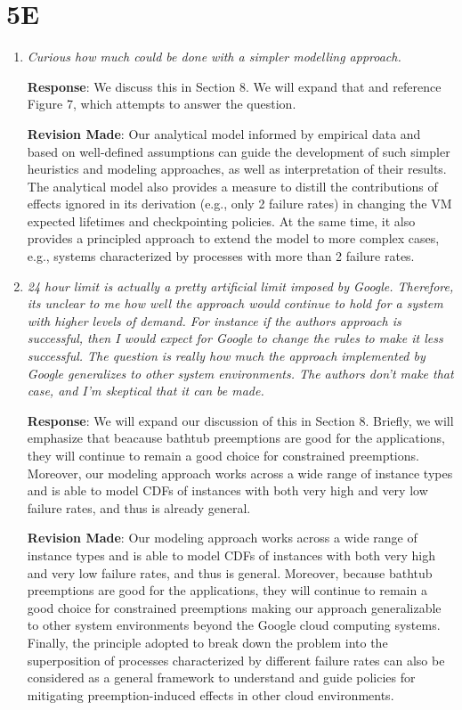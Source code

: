 \documentclass{article}
\newcommand{\resp}[1]{\textbf{Response}: #1}
\newcommand{\revmade}[1]{\textbf{Revision Made}: #1}
\begin{document}
\section{5E}

\begin{enumerate}

\item \emph{Curious how much could be done with a simpler modelling approach.}

\resp{We discuss this in Section 8. We will expand that and reference Figure 7, which attempts to answer the question.}

\revmade{Our analytical model informed by empirical data and based on well-defined assumptions can guide the development of such simpler heuristics and modeling approaches, as well as interpretation of their results.
The analytical model also provides a measure to distill the contributions of effects ignored in its derivation (e.g., only 2 failure rates) in changing the VM expected lifetimes and checkpointing policies. At the same time, it also provides a principled approach to extend the model to more complex cases, e.g., systems characterized by processes with more than 2 failure rates.
}

\item \emph{24 hour limit is actually a pretty artificial limit imposed by Google. Therefore, its unclear to me how well the approach would continue to hold for a system with higher levels of demand. For instance if the authors approach is successful, then I would expect for Google to change the rules to make it less successful. The question is really how much the approach implemented by Google generalizes to other system environments. The authors don't make that case, and I'm skeptical that it can be made.}

\resp{We will expand our discussion of this in Section 8. Briefly, we will emphasize that  beacause bathtub preemptions are good for the applications, they will continue to remain a good choice for constrained preemptions. Moreover, our modeling approach works across a wide range of instance types and is able to model CDFs of instances with both very high and very low failure rates, and thus is already general. }

\revmade{Our modeling approach works across a wide range of instance types and is able to model CDFs of instances with both very high and very low failure rates, and thus is general. Moreover, because bathtub preemptions are good for the applications, they will continue to remain a good choice for constrained preemptions making our approach generalizable to other system environments beyond the Google cloud computing systems. Finally, the principle adopted to break down the problem into the superposition of processes characterized by different failure rates can also be considered as a general framework to understand and guide policies for mitigating preemption-induced effects in other cloud environments.}

\end{enumerate}
\end{document}
